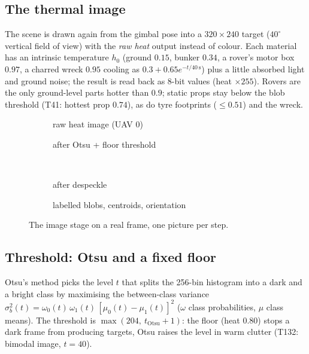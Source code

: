 \subsection{The thermal image}
The scene is drawn again from the gimbal pose into a $320\times240$ target ($40^\circ$ vertical field of view) with the \emph{raw heat} output instead of colour. Each material has an intrinsic temperature $h_0$ (ground $0.15$, bunker $0.34$, a rover's motor box $0.97$, a charred wreck $0.95$ cooling
as $0.3+0.65e^{-t/40\,\text{s}}$) plus a little absorbed light and ground noise; the result is read back as 8-bit values (heat $\times255$). Rovers are the only ground-level parts hotter than $0.9$; static props stay below the blob threshold (T41: hottest prop $0.74$), as do tyre footprints ($\le0.51$) and the wreck.
\begin{figure}[h]
\centering
\begin{subfigure}{0.49\linewidth}\caption{raw heat image (UAV 0)}\end{subfigure}
\begin{subfigure}{0.49\linewidth}\caption{after Otsu + floor threshold}\end{subfigure}\\[1mm]
\begin{subfigure}{0.49\linewidth}\caption{after despeckle}\end{subfigure}
\begin{subfigure}{0.49\linewidth}\caption{labelled blobs, centroids, orientation}\end{subfigure}
\caption{The image stage on a real frame, one picture per step.}\label{fig:cvstages}
\end{figure}

\subsection{Threshold: Otsu and a fixed floor}
Otsu's method picks the level $t$ that splits the 256-bin histogram into a dark and a bright class by maximising the between-class variance
$\sigma_b^2(t)=\omega_0(t)\,\omega_1(t)\,[\mu_0(t)-\mu_1(t)]^2$ ($\omega$ class probabilities, $\mu$ class means). The threshold is $\max(204,\ t_\text{Otsu}+1)$: the floor (heat 0.80) stops a dark frame from producing targets,
Otsu raises the level in warm clutter (T132: bimodal image, $t=40$).
\lstOtsu

